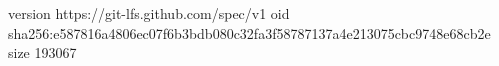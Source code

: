 version https://git-lfs.github.com/spec/v1
oid sha256:e587816a4806ec07f6b3bdb080c32fa3f58787137a4e213075cbc9748e68cb2e
size 193067

